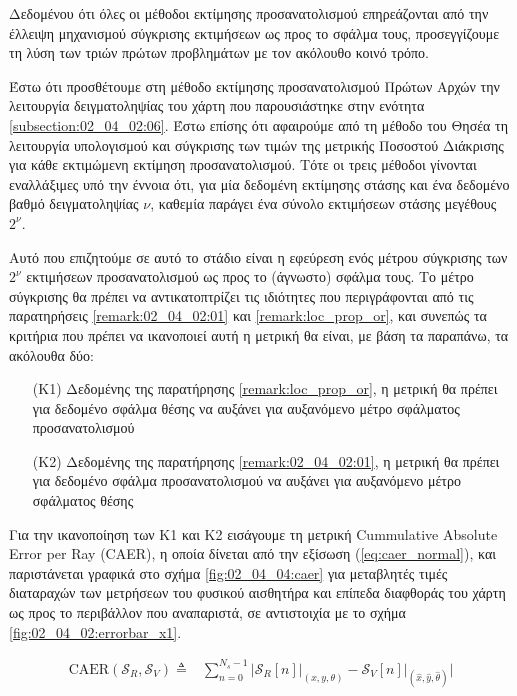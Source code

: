 Δεδομένου ότι όλες οι μέθοδοι εκτίμησης προσανατολισμού επηρεάζονται από την
έλλειψη μηχανισμού σύγκρισης εκτιμήσεων ως προς το σφάλμα τους, προσεγγίζουμε
τη λύση των τριών πρώτων προβλημάτων με τον ακόλουθο κοινό τρόπο.

Έστω ότι προσθέτουμε στη μέθοδο εκτίμησης προσανατολισμού Πρώτων Αρχών την
λειτουργία δειγματοληψίας του χάρτη που παρουσιάστηκε στην ενότητα
\ref{subsection:02_04_02:06}. Έστω επίσης ότι αφαιρούμε από τη μέθοδο του Θησέα
τη λειτουργία υπολογισμού και σύγκρισης των τιμών της μετρικής Ποσοστού
Διάκρισης για κάθε εκτιμώμενη εκτίμηση προσανατολισμού. Τότε οι τρεις μέθοδοι
γίνονται εναλλάξιμες υπό την έννοια ότι, για μία δεδομένη εκτίμησης στάσης και
ένα δεδομένο βαθμό δειγματοληψίας $\nu$, καθεμία παράγει ένα σύνολο εκτιμήσεων
στάσης μεγέθους $2^\nu$.

Αυτό που επιζητούμε σε αυτό το στάδιο είναι η εφεύρεση ενός μέτρου σύγκρισης
των $2^\nu$ εκτιμήσεων προσανατολισμού ως προς το (άγνωστο) σφάλμα τους. Το
μέτρο σύγκρισης θα πρέπει να αντικατοπτρίζει τις ιδιότητες που περιγράφονται
από τις παρατηρήσεις \ref{remark:02_04_02:01} και \ref{remark:loc_prop_or},
και συνεπώς τα κριτήρια που πρέπει να ικανοποιεί αυτή η μετρική θα είναι, με
βάση τα παραπάνω, τα ακόλουθα δύο:

\begin{itemize}
  \item[(K1)] Δεδομένης της παρατήρησης \ref{remark:loc_prop_or}, η μετρική θα
        πρέπει για δεδομένο σφάλμα θέσης να αυξάνει για αυξανόμενο μέτρο
        σφάλματος προσανατολισμού
  \item[(K2)] Δεδομένης της παρατήρησης \ref{remark:02_04_02:01}, η μετρική θα
        πρέπει για δεδομένο σφάλμα προσανατολισμού να αυξάνει για αυξανόμενο
        μέτρο σφάλματος θέσης
\end{itemize}

Για την ικανοποίηση των Κ1 και Κ2 εισάγουμε τη μετρική Cummulative Absolute
Error per Ray (CAER), η οποία δίνεται από την εξίσωση (\ref{eq:caer_normal}),
και παριστάνεται γραφικά στο σχήμα \ref{fig:02_04_04:caer} για μεταβλητές τιμές
διαταραχών των μετρήσεων του φυσικού αισθητήρα και επίπεδα διαφθοράς του χάρτη
ως προς το περιβάλλον που αναπαριστά, σε αντιστοιχία με το σχήμα
\ref{fig:02_04_02:errorbar_x1}.

\begin{align}
  \text{CAER}(\mathcal{S}_R, \mathcal{S}_V) \triangleq & \sum\limits_{n=0}^{N_s-1} \Bigg|
    \mathcal{S}_R[n]\Big|_{(x, y, \theta)} -
    \mathcal{S}_V[n]\Big|_{(\hat{x}, \hat{y}, \hat{\theta})} \Bigg|
  \label{eq:caer_normal}
\end{align}

